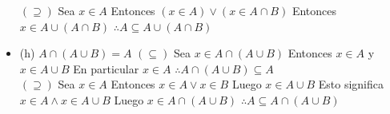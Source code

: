 \begin{itemize}
	$(\supseteq)$\newline
	Sea $x \in A$\newline
	Entonces $(x \in A) \lor (x \in A \cap B)$\newline
	Entonces $x \in A \cup (A \cap B)$\newline
	$\therefore A \subseteq A \cup (A \cap B)$
	
	\item (h) $A \cap (A \cup B) = A$\newline
	$(\subseteq)$\newline
	Sea $x \in A \cap (A \cup B)$\newline
	Entonces $x \in A$ y $x \in A \cup B$\newline
	En particular $x \in A$\newline
	$\therefore A \cap (A \cup B ) \subseteq A$\newline\\
	
	$(\supseteq)$\newline
	Sea $x \in A$\newline
	Entonces $x \in A \lor x \in B$\newline
	Luego $x \in A \cup B$\newline
	Esto significa $x \in A \wedge x \in A \cup B$\newline
	Luego $x \in A \cap (A \cup B)$\newline
	$\therefore A \subseteq A \cap (A \cup B)$
\end{itemize}